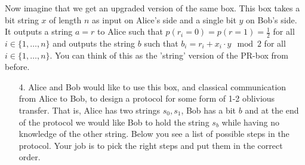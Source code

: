\begin{exercises}
\begin{enumerate}
\end{enumerate}
Now imagine that we get an upgraded version of the same box. This box takes a bit string \(x\) of length \(n\) as input on Alice's side and a single bit \(y\) on Bob's side. It outputs a string \(a = r\) to Alice such that \(p(r_i=0)= p(r=1) = \frac{1}{2}\) for all \(i\in \{1,\ldots,n\}\) and outputs the string \(b\) such that \(b_i = r_i + x_i\cdot y\mod 2 \) for all \(i\in\{1,\ldots,n\}\). You can think of this as the 'string' version of the PR-box from before.
\begin{enumerate}
\item[4.] Alice and Bob would like to use this box, and classical communication from Alice to Bob, to design a protocol for some form of 1-2 oblivious transfer. That is, Alice has two strings \(s_0,s_1\), Bob has a bit \(b\) and at the end of the protocol we would like Bob to hold the string \(s_b\) while having no knowledge of the other string. Below you see a list of possible steps in the protocol. Your job is to pick the right steps and put them in the correct order.


\end{enumerate}
\end{exercises}

